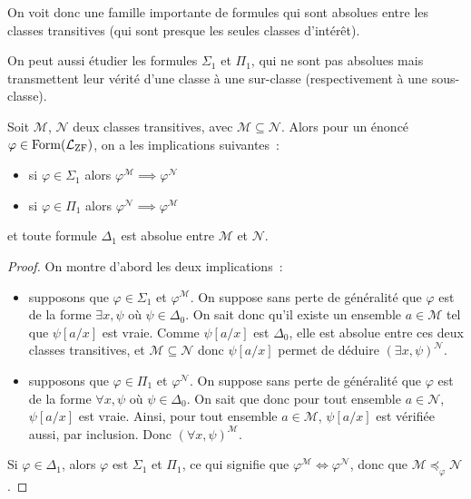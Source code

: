 On voit donc une famille importante de formules qui sont absolues entre les
classes transitives (qui sont presque les seules classes d'intérêt).

On peut aussi étudier les formules $\Sigma_1$ et $\Pi_1$, qui ne sont pas
absolues mais transmettent leur vérité d'une classe à une sur-classe
(respectivement à une sous-classe).

\begin{proposition}
  Soit $\mathcal M$, $\mathcal N$ deux classes transitives, avec
  $\mathcal M \subseteq \mathcal N$. Alors pour un énoncé
  $\varphi\in\operatorname{Form}(\mathcal L_{\operatorname{ZF}})$, on a les implications suivantes~:
  \begin{itemize}
  \item si $\varphi \in \Sigma_1$ alors
    $\varphi^{\mathcal M} \implies \varphi^{\mathcal N}$
  \item si $\varphi \in \Pi_1$ alors
    $\varphi^{\mathcal N} \implies \varphi^{\mathcal M}$
  \end{itemize}
  et toute formule $\Delta_1$ est absolue entre $\mathcal M$ et $\mathcal N$.
\end{proposition}

\begin{proof}
  On montre d'abord les deux implications~:
  \begin{itemize}
  \item supposons que $\varphi \in \Sigma_1$ et $\varphi^{\mathcal M}$. On
    suppose sans perte de généralité que $\varphi$ est de la forme
    $\exists x, \psi$ où $\psi\in\Delta_0$. On sait donc qu'il existe un
    ensemble $a\in\mathcal M$ tel que $\psi[a/x]$ est vraie. Comme
    $\psi[a/x]$ est $\Delta_0$, elle est absolue entre ces deux classes
    transitives, et $\mathcal M \subseteq\mathcal N$ donc $\psi[a/x]$
    permet de déduire $(\exists x, \psi)^{\mathcal N}$.
  \item supposons que $\varphi \in \Pi_1$ et $\varphi^{\mathcal N}$. On
    suppose sans perte de généralité que $\varphi$ est de la forme
    $\forall x, \psi$ où $\psi\in\Delta_0$. On sait que donc pour tout
    ensemble $a\in \mathcal N$, $\psi[a/x]$ est vraie. Ainsi, pour tout
    ensemble $a\in \mathcal M$, $\psi[a/x]$ est vérifiée aussi, par inclusion.
    Donc $(\forall x, \psi)^{\mathcal M}$.
  \end{itemize}

  Si $\varphi\in\Delta_1$, alors $\varphi$ est $\Sigma_1$ et $\Pi_1$, ce qui
  signifie que $\varphi^{\mathcal M}\iff \varphi^{\mathcal N}$, donc que
  $\mathcal M\preccurlyeq_\varphi \mathcal N$.
\end{proof}

